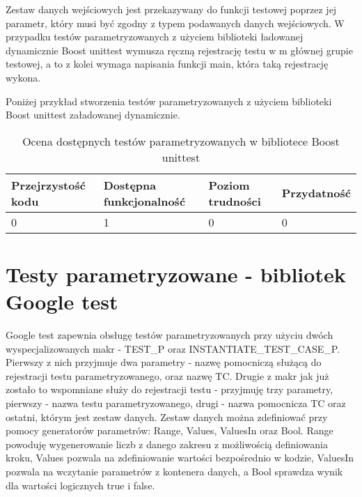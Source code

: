 \documentclass[12pt,a4paper,notitlepage]{report}
\begin{document}
Zestaw danych wejściowych jest przekazywany do funkcji testowej poprzez jej parametr, który musi być zgodny z typem podawanych danych wejściowych.
W przypadku testów parametryzowanych z użyciem biblioteki ładowanej dynamicznie Boost unittest wymusza ręczną rejestrację testu w m głównej grupie testowej, a to z kolei wymaga napisania funkcji main, która taką rejestrację wykona.

Poniżej przykład stworzenia testów parametryzowanych z użyciem biblioteki Boost unittest załadowanej dynamicznie.

			

\begin{center}
			\begin{table}[!ht]
			\caption{Ocena dostępnych testów parametryzowanych w bibliotece Boost unittest}
			\label{}
			\begin{tabular}[!hc]{|l|l|l|l|}
		\hline
		Przejrzystość kodu 	&	Dostępna funkcjonalność	&	Poziom trudności	&	Przydatność \\ \hline
		0					&	1						&	0					& 	0  			\\ \hline
			\end{tabular}
			\end{table} 
		\end{center}

\section{Testy parametryzowane - bibliotek Google test}

Google test zapewnia obsługę testów parametryzowanych przy użyciu dwóch wyspecjalizowanych makr - TEST{\_}P oraz INSTANTIATE{\_}TEST{\_}CASE{\_}P.
Pierwszy z nich przyjmuje dwa parametry - nazwę pomocniczą służącą do rejestracji testu parametryzowanego, oraz nazwę TC. Drugie z makr jak już zostało to wspomniane służy do rejestracji testu  - przyjmuję trzy parametry, pierwszy - nazwa testu parametryzowanego, drugi - nazwa pomocnicza TC oraz ostatni, którym jest zestaw danych.
Zestaw danych można zdefiniować przy pomocy generatorów parametrów: Range, Values, ValuesIn oraz Bool. Range powoduję wygenerowanie liczb z danego zakresu z możliwością definiowania kroku, Values pozwala na zdefiniowanie wartości bezpośrednio w kodzie, ValuesIn pozwala na wczytanie parametrów z kontenera danych, a Bool sprawdza wynik dla wartości logicznych true i false.
\end{document}
